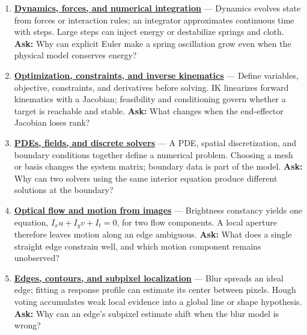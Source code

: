 \begin{enumerate}
\item
  \textbf{\href{Continuous\%20Notes/University\%20-\%20Worlds,\%20Images\%20and\%20Inference\%20-\%20Graphics,\%20Vision\%20and\%20Photography\#Dynamics,\%20forces,\%20and\%20numerical\%20integration}{Dynamics, forces, and numerical integration}} --- Dynamics evolves state from forces or interaction rules; an integrator approximates continuous time with steps. Large steps can inject energy or destabilize springs and cloth. \textbf{Ask:} Why can explicit Euler make a spring oscillation grow even when the physical model conserves energy?
\item
  \textbf{\href{Continuous\%20Notes/University\%20-\%20Worlds,\%20Images\%20and\%20Inference\%20-\%20Graphics,\%20Vision\%20and\%20Photography\#Optimization,\%20constraints,\%20and\%20inverse\%20kinematics}{Optimization, constraints, and inverse kinematics}} --- Define variables, objective, constraints, and derivatives before solving. IK linearizes forward kinematics with a Jacobian; feasibility and conditioning govern whether a target is reachable and stable. \textbf{Ask:} What changes when the end-effector Jacobian loses rank?
\item
  \textbf{\href{Continuous\%20Notes/University\%20-\%20Worlds,\%20Images\%20and\%20Inference\%20-\%20Graphics,\%20Vision\%20and\%20Photography\#PDEs,\%20fields,\%20and\%20discrete\%20solvers}{PDEs, fields, and discrete solvers}} --- A PDE, spatial discretization, and boundary conditions together define a numerical problem. Choosing a mesh or basis changes the system matrix; boundary data is part of the model. \textbf{Ask:} Why can two solvers using the same interior equation produce different solutions at the boundary?
\item
  \textbf{\href{Continuous\%20Notes/University\%20-\%20Worlds,\%20Images\%20and\%20Inference\%20-\%20Graphics,\%20Vision\%20and\%20Photography\#Optical\%20flow\%20and\%20motion\%20from\%20images}{Optical flow and motion from images}} --- Brightness constancy yields one equation, \(I_xu+I_yv+I_t=0\), for two flow components. A local aperture therefore leaves motion along an edge ambiguous. \textbf{Ask:} What does a single straight edge constrain well, and which motion component remains unobserved?
\item
  \textbf{\href{Continuous\%20Notes/University\%20-\%20Worlds,\%20Images\%20and\%20Inference\%20-\%20Graphics,\%20Vision\%20and\%20Photography\#Edges,\%20contours,\%20and\%20subpixel\%20localization}{Edges, contours, and subpixel localization}} --- Blur spreads an ideal edge; fitting a response profile can estimate its center between pixels. Hough voting accumulates weak local evidence into a global line or shape hypothesis. \textbf{Ask:} Why can an edge's subpixel estimate shift when the blur model is wrong?

\end{enumerate}
